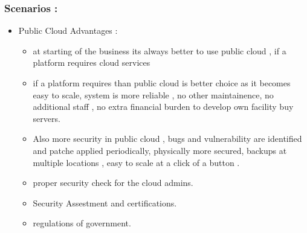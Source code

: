 \documentclass[11pt]{article}
\begin{document}
\subsubsection{Scenarios :}
\label{sec:org6e948d0}
\begin{itemize}
\item Public Cloud Advantages :
\begin{itemize}
\item at starting of the business its always better to use public cloud , if a platform
requires cloud services
\item if a platform requires than public cloud is better choice as it becomes easy to
scale, system is more reliable , no other maintainence, no additional staff
, no extra financial burden to develop own facility buy servers.
\item Also more security in public cloud , bugs  and vulnerability are identified
and patche applied periodically, physically more secured, backups at multiple
locations , easy to scale at a click of a button .
\item proper security check for the cloud admins.
\item Security Assestment and certifications.
\item regulations of government.
\end{itemize}
\end{itemize}
\end{document}
